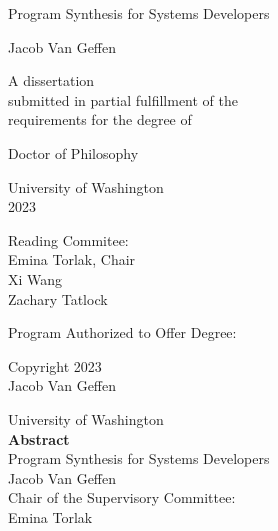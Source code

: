 \documentclass[12pt]{book}
\title{\mytitle}
\author{\myauthor}
\def\mytitle{Program Synthesis for Systems Developers}
\def\myauthor{Jacob Van Geffen}
\def\year{2023}
\begin{document}
\pagestyle{empty}

\begin{center}
  {\huge \mytitle}
  \vfill

  {\Large \myauthor}
  \vfill

  \begin{spacing}{1}
    A dissertation \\
    submitted in partial fulfillment of the \\
    requirements for the degree of
  \end{spacing}
  \vfill

  Doctor of Philosophy
  \vfill

  University of Washington \\
  \year
  \vfill

  Reading Commitee: \\
  Emina Torlak, Chair \\
  Xi Wang \\
  Zachary Tatlock %
  \vfill

  \begin{spacing}{1}
    Program Authorized to Offer Degree: \\
    \cse
  \end{spacing}
  \clearpage

  \textcopyright{} Copyright \year\\
  \myauthor
  \clearpage
\end{center}

\pagestyle{plain}
\setcounter{page}{1}

\begin{center}
  University of Washington \\[1em]
  \textbf{Abstract}        \\[1em]
  \mytitle                 \\[1em]
  \myauthor                \\[1em]

  Chair of the Supervisory Committee: \\[-0.5em]
  Emina Torlak \\[-0.5em]
  \pgas
  \\[2em]
\end{center}

\end{document}
